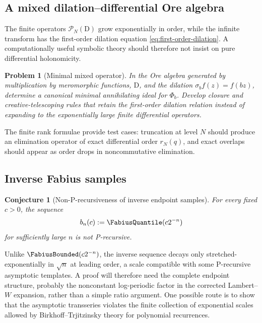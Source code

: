 \documentclass[11pt]{article}
\numberwithin{equation}{section}
\newtheorem{conjecture}[theorem]{Conjecture}
\newtheorem{problem}[theorem]{Problem}
\theoremstyle{definition}
\theoremstyle{remark}
\newcommand{\D}{\mathrm D}
\begin{document}
\subsection{A mixed dilation--differential Ore algebra}

The finite operators $\mathcal P_N(\D)$ grow exponentially in order, while the
infinite transform has the first-order dilation equation
\eqref{eq:first-order-dilation}.  A computationally useful symbolic theory
should therefore not insist on pure differential holonomicity.

\begin{problem}[Minimal mixed operator]
\label{problem:mixed-Ore}
In the Ore algebra generated by multiplication by meromorphic functions,
$\D$, and the dilation $\sigma_bf(z)=f(bz)$, determine a canonical minimal
annihilating ideal for $\Phi_b$.  Develop closure and creative-telescoping rules
that retain the first-order dilation relation instead of expanding to the
exponentially large finite differential operators.
\end{problem}

The finite rank formulae provide test cases: truncation at level $N$ should
produce an elimination operator of exact differential order $r_N(q)$, and
exact overlaps should appear as order drops in noncommutative elimination.

\subsection{Inverse Fabius samples}

\begin{conjecture}[Non-P-recursiveness of inverse endpoint samples]
\label{conj:inverse-samples}
For every fixed $c>0$, the sequence
\begin{equation}
 b_n(c):=\FabiusQuantile(c2^{-n})
 \label{eq:inverse-sample}
\end{equation}
for sufficiently large $n$ is not P-recursive.
\end{conjecture}

Unlike $\FabiusBounded(c2^{-n})$, the inverse sequence decays only stretched-exponentially
in $\sqrt n$ at leading order, a scale compatible with some P-recursive
asymptotic templates.  A proof will therefore need the complete endpoint
structure, probably the nonconstant log-periodic factor in the corrected
Lambert--$W$ expansion, rather than a simple ratio argument.  One possible
route is to show that the asymptotic transseries violates the finite collection
of exponential scales allowed by Birkhoff--Trjitzinsky theory for polynomial
recurrences.
\end{document}
